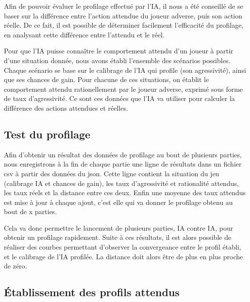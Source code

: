 \documentclass{report}
\begin{document}
\hspace{0.5cm}Afin de pouvoir évaluer le profilage effectué par l'IA, il nous a été conseillé de se baser sur la différence entre l'action attendue du joueur adverse, puis son action réelle. De ce fait, il est possible de déterminer facilement l'efficacité du profilage, en analysant cette différence entre l'attendu et le réel.\par
Pour que l'IA puisse connaître le comportement attendu d'un joueur à partir d'une situation donnée, nous avons établi l'ensemble des scénarios possibles. Chaque scénario se base sur le calibrage de l'IA qui profile (son agressivité), ainsi que ses chances de gain. Pour chacune de ces situations, on établit le comportement attendu rationellement par le joueur adverse, exprimé sous forme de taux d'agressivité. Ce sont ces données que l'IA va utiliser pour calculer la différence des actions attendues et réelles.\\

\subsection{Test du profilage}

\hspace{0.5cm}Afin d'obtenir un résultat des données de profilage au bout de plusieurs parties, nous enregistrons à la fin de chaque partie une ligne de résultats dans un fichier csv à partir des données du json. Cette ligne contient la situation du jeu (calibrage IA et chances de gain), les taux d'agressivité et rationalité attendus, les taux réels et la distance entre ces deux. Enfin une moyenne des taux attendus est mise à jour à chaque ajout, c'est elle qui va donner le profilage obtenu au bout de x parties.\par
Cela va donc permettre le lancement de plusieurs parties, IA contre IA, pour obtenir un profilage rapidement. Suite à ces résultats, il est alors possible de réaliser des courbes permettant d'observer la convergeance entre le profil établi, et le calibrage de l'IA profilée. La distance doit alors être de plus en plus proche de zéro.


\subsection{Établissement des profils attendus}
\end{document}
